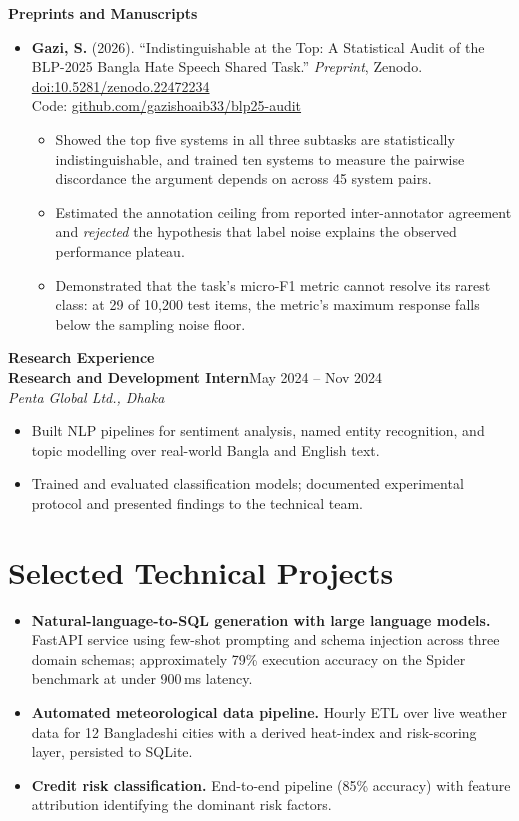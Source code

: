 \documentclass[10pt,a4paper]{article}
\newcommand{\entry}[4]{%
  \textbf{#1}\hfill{#2}\\
  \textit{#3}\hfill{#4}\\[2pt]}
\begin{document}
\textbf{Preprints and Manuscripts}
\begin{itemize}
\item \textbf{Gazi, S.} (2026). ``Indistinguishable at the Top: A Statistical
      Audit of the BLP-2025 Bangla Hate Speech Shared Task.''
      \textit{Preprint}, Zenodo.
      \href{https://doi.org/10.5281/zenodo.22472234}{doi:10.5281/zenodo.22472234}\\
      Code: \href{https://github.com/gazishoaib33/blp25-audit}{github.com/gazishoaib33/blp25-audit}
      \begin{itemize}
      \item Showed the top five systems in all three subtasks are statistically
            indistinguishable, and trained ten systems to measure the pairwise
            discordance the argument depends on across 45 system pairs.
      \item Estimated the annotation ceiling from reported inter-annotator
            agreement and \emph{rejected} the hypothesis that label noise
            explains the observed performance plateau.
      \item Demonstrated that the task's micro-F1 metric cannot resolve its
            rarest class: at 29 of 10,200 test items, the metric's maximum
            response falls below the sampling noise floor.
      \end{itemize}
\end{itemize}

\vspace{3pt}
\textbf{Research Experience}\\[3pt]
\entry{Research and Development Intern}{May 2024 -- Nov 2024}
{Penta Global Ltd., Dhaka}{}
\begin{itemize}
\item Built NLP pipelines for sentiment analysis, named entity recognition, and
      topic modelling over real-world Bangla and English text.
\item Trained and evaluated classification models; documented experimental
      protocol and presented findings to the technical team.
\end{itemize}

\section{Selected Technical Projects}
\begin{itemize}
\item \textbf{Natural-language-to-SQL generation with large language models.}
      FastAPI service using few-shot prompting and schema injection across three
      domain schemas; approximately 79\% execution accuracy on the Spider
      benchmark at under 900\,ms latency.
\item \textbf{Automated meteorological data pipeline.} Hourly ETL over live
      weather data for 12 Bangladeshi cities with a derived heat-index and
      risk-scoring layer, persisted to SQLite.
\item \textbf{Credit risk classification.} End-to-end pipeline (85\% accuracy)
      with feature attribution identifying the dominant risk factors.
\end{itemize}
\end{document}
